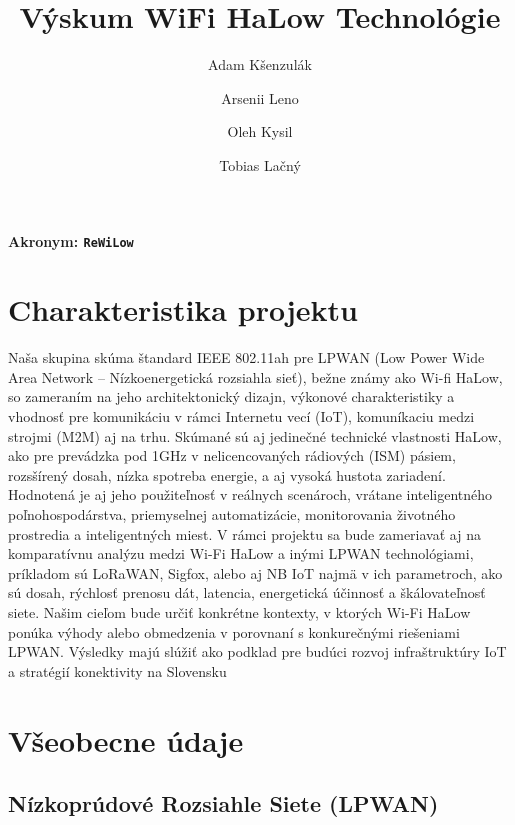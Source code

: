 \documentclass[11pt]{article}
\title{ \bf Výskum WiFi HaLow Technológie}
\author{Adam Kšenzulák\and Arsenii Leno\and Oleh Kysil\and Tobias Lačný}
\date{}
\begin{document}
\maketitle
\paragraph {\bf Akronym: \tt ReWiLow}
\section*{\bf Charakteristika projektu}

Naša skupina skúma štandard IEEE 802.11ah pre LPWAN (Low Power Wide Area Network – Nízkoenergetická rozsiahla sieť), bežne známy ako Wi-fi HaLow, so zameraním  na jeho architektonický dizajn, výkonové charakteristiky a vhodnosť pre komunikáciu v rámci Internetu vecí (IoT), komuníkaciu medzi strojmi (M2M) aj na trhu. Skúmané sú aj jedinečné technické vlastnosti HaLow, ako pre prevádzka pod 1GHz v nelicencovaných rádiových (ISM) pásiem, rozsšírený dosah, nízka spotreba energie, a aj vysoká hustota zariadení. Hodnotená je aj jeho použiteľnosť v reálnych scenároch, vrátane inteligentného poľnohospodárstva, priemyselnej automatizácie, monitorovania životného prostredia a inteligentných miest.
V rámci projektu sa bude zameriavať aj na komparatívnu analýzu medzi Wi-Fi HaLow a inými LPWAN technológiami, príkladom sú LoRaWAN, Sigfox, alebo aj NB IoT najmä v ich parametroch, ako sú dosah, rýchlosť prenosu dát, latencia, energetická účinnosť a škálovateľnosť siete. Našim cieľom bude určiť konkrétne kontexty, v ktorých Wi-Fi HaLow ponúka výhody alebo obmedzenia v porovnaní s konkurečnými riešeniami LPWAN. Výsledky majú slúžiť ako podklad pre budúci rozvoj infraštruktúry IoT a stratégií konektivity na Slovensku

\section*{\bf Všeobecne údaje}


\subsection*{\bf Nízkoprúdové Rozsiahle Siete (LPWAN)}
\end{document}
